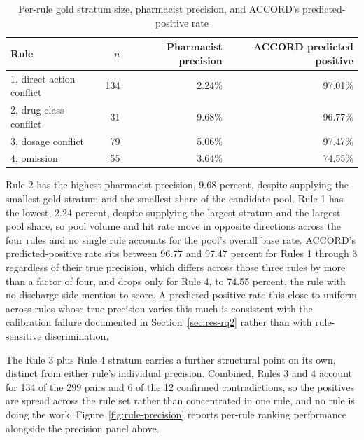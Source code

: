\begin{table}[H]
\caption{Per-rule gold stratum size, pharmacist precision, and ACCORD's predicted-positive rate}
\label{tab:rule-precision}
\centering
\small
\begin{tabular}{lrrr}
\toprule
\textbf{Rule} & \textbf{$n$} & \textbf{Pharmacist precision} & \textbf{ACCORD predicted positive} \\
\midrule
1, direct action conflict & 134 & 2.24\% & 97.01\% \\
2, drug class conflict    & 31  & 9.68\% & 96.77\% \\
3, dosage conflict        & 79  & 5.06\% & 97.47\% \\
4, omission                & 55  & 3.64\% & 74.55\% \\
\bottomrule
\end{tabular}
\end{table}

Rule 2 has the highest pharmacist precision, 9.68 percent, despite supplying the smallest gold
stratum and the smallest share of the candidate pool. Rule 1 has the lowest, 2.24 percent, despite
supplying the largest stratum and the largest pool share, so pool volume and hit rate move in
opposite directions across the four rules and no single rule accounts for the pool's overall base
rate. ACCORD's predicted-positive rate sits between 96.77 and 97.47 percent for Rules 1 through 3
regardless of their true precision, which differs across those three rules by more than a factor of
four, and drops only for Rule 4, to 74.55 percent, the rule with no discharge-side mention to score.
A predicted-positive rate this close to uniform across rules whose true precision varies this much
is consistent with the calibration failure documented in Section~\ref{sec:res-rq2} rather than with
rule-sensitive discrimination.

The Rule 3 plus Rule 4 stratum carries a further structural point on its own, distinct from either
rule's individual precision. Combined, Rules 3 and 4 account for 134 of the 299 pairs and 6 of the
12 confirmed contradictions, so the positives are spread across the rule set rather than
concentrated in one rule, and no rule is doing the work. Figure~\ref{fig:rule-precision} reports
per-rule ranking performance alongside the precision panel above.

